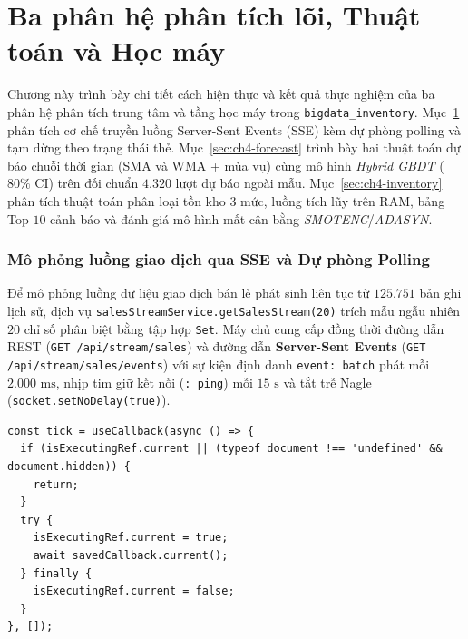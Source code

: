 
\part{Ba phân hệ phân tích lõi, Thuật toán và Học máy}
\label{part:ch4}

Chương này trình bày chi tiết cách hiện thực và kết quả thực nghiệm của ba phân hệ phân tích trung tâm và tầng học máy trong \texttt{bigdata_inventory}. Mục~\ref{sec:ch4-stream} phân tích cơ chế truyền luồng Server-Sent Events (SSE) kèm dự phòng polling và tạm dừng theo trạng thái thẻ. Mục~\ref{sec:ch4-forecast} trình bày hai thuật toán dự báo chuỗi thời gian (SMA và WMA + mùa vụ) cùng mô hình \textit{Hybrid GBDT} ($80\%$ CI) trên đối chuẩn $4.320$ lượt dự báo ngoài mẫu. Mục~\ref{sec:ch4-inventory} phân tích thuật toán phân loại tồn kho $3$ mức, luồng tích lũy trên RAM, bảng Top $10$ cảnh báo và đánh giá mô hình mất cân bằng \textit{SMOTENC}/\textit{ADASYN}.

\section{Mô phỏng luồng giao dịch qua SSE và Dự phòng Polling}
\label{sec:ch4-stream}
Để mô phỏng luồng dữ liệu giao dịch bán lẻ phát sinh liên tục từ $125.751$ bản ghi lịch sử, dịch vụ \texttt{salesStreamService.getSalesStream(20)} trích mẫu ngẫu nhiên $20$ chỉ số phân biệt bằng tập hợp \texttt{Set}. Máy chủ cung cấp đồng thời đường dẫn REST (\texttt{GET /api/stream/sales}) và đường dẫn \textbf{Server-Sent Events} (\texttt{GET /api/stream/sales/events}) với sự kiện định danh \texttt{event: batch} phát mỗi $2.000\text{ ms}$, nhịp tim giữ kết nối (\texttt{: ping}) mỗi $15\text{ s}$ và tắt trễ Nagle (\texttt{socket.setNoDelay(true)}).

\begin{listing}[H]
	\begin{verbatim}
const tick = useCallback(async () => {
  if (isExecutingRef.current || (typeof document !== 'undefined' && document.hidden)) {
    return;
  }
  try {
    isExecutingRef.current = true;
    await savedCallback.current();
  } finally {
    isExecutingRef.current = false;
  }
}, []);
\end{verbatim}
	\caption{Cơ chế chống chồng chéo và tạm dừng theo tab ẩn trong \texttt{usePolling.js}}
	\label{lst:use-polling}
\end{listing}

